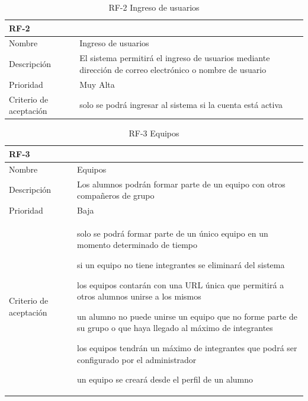 \documentclass[11pt,spanish,listoffigures,listoftables]{tfgetsinf}
\begin{document}
\begin{table}[!ht]
	\centering
	\begin{tabular}{ |p{4cm}||p{10cm}|  }
		\multicolumn{2}{l}{\textbf{RF-2}} \\
		\hline
		Nombre & Ingreso de usuarios\\
		\hline
		Descripción & El sistema permitirá el ingreso de usuarios mediante dirección de correo electrónico o nombre de usuario  \\
		\hline
		Prioridad & Muy Alta\\
		\hline
		Criterio de aceptación & 
			solo se podrá ingresar al sistema si la cuenta está activa \\
		\hline
	\end{tabular}
	\caption{RF-2 Ingreso de usuarios}
	\label{table:2}
\end{table}

\begin{table}[!ht]
	\centering
	\begin{tabular}{ |p{4cm}||p{10cm}|  }
		\multicolumn{2}{l}{\textbf{RF-3}} \\
		\hline
		Nombre & Equipos\\
		\hline
		Descripción & Los \gls{alumno}s podrán formar parte de un \gls{equipo} con otros compañeros de \gls{grupo}  \\
		\hline
		Prioridad & Baja\\
		\hline
		Criterio de aceptación & 
		\begin{tabitem}
			\item solo se podrá formar parte de un único \gls{equipo} en un momento determinado de tiempo
			\item si un \gls{equipo} no tiene integrantes se eliminará del sistema
			\item los \gls{equipo}s contarán con una URL única que permitirá a otros \gls{alumno}s unirse a los mismos
			\item un \gls{alumno} no puede unirse un \gls{equipo} que no forme parte de su \gls{grupo} o que haya llegado al máximo de integrantes
			\item los \gls{equipo}s tendrán un máximo de integrantes que podrá ser configurado por el \gls{administrador}
			\item un \gls{equipo} se creará desde el perfil de un \gls{alumno}
		\end{tabitem} \\
		\hline
	\end{tabular}
	\caption{RF-3 Equipos}
	\label{table:3}
\end{table}
\end{document}
